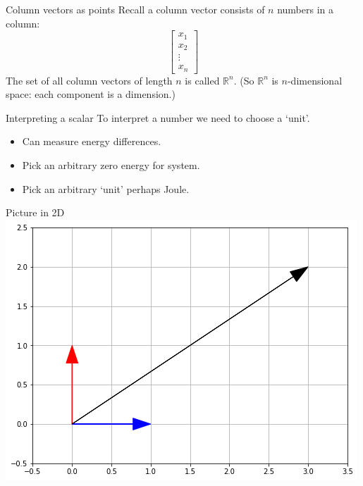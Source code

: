 \documentclass{beamer}
\begin{document}
\begin{frame}{Column vectors as points}
  Recall a column vector consists of $n$ numbers in a column:
  \begin{equation*}
    \left[
      \begin{array}{c}
        x_1\\
        x_2\\
        \vdots\\
        x_n
      \end{array}
    \right]
  \end{equation*}
  The set of all column vectors of length $n$ is called $\mathbb R^n$.\vfill
  (So $\mathbb R^n$ is $n$-dimensional space: each component is a dimension.)
\end{frame}

\begin{frame}{Interpreting a scalar}
  To interpret a number we need to choose a `unit'.
  \begin{example}[Energy]
    \begin{itemize}
    \item Can measure energy differences.
    \item Pick an arbitrary zero energy for system.
    \item Pick an arbitrary `unit' perhaps Joule.
    \end{itemize}
  \end{example}
\end{frame}

\begin{frame}{Picture in 2D}
  \includegraphics[scale=0.6]{2dvector.png}
\end{frame}
\end{document}
